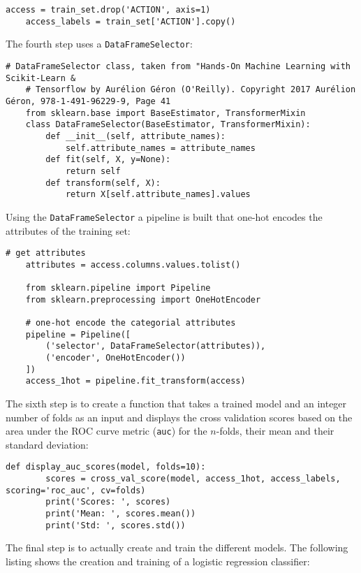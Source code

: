 \documentclass[11pt]{article}
\begin{document}
\begin{lstlisting}[frame=single]
    access = train_set.drop('ACTION', axis=1)
    access_labels = train_set['ACTION'].copy()
\end{lstlisting}
\noindent
The fourth step uses a {\tt DataFrameSelector}:

\begin{lstlisting}[frame=single]
    # DataFrameSelector class, taken from "Hands-On Machine Learning with Scikit-Learn & 
    # Tensorflow by Aurélion Géron (O'Reilly). Copyright 2017 Aurélion Géron, 978-1-491-96229-9, Page 41
    from sklearn.base import BaseEstimator, TransformerMixin
    class DataFrameSelector(BaseEstimator, TransformerMixin):
        def __init__(self, attribute_names):
            self.attribute_names = attribute_names
        def fit(self, X, y=None):
            return self
        def transform(self, X):
            return X[self.attribute_names].values
\end{lstlisting}
\noindent
Using the {\tt DataFrameSelector} a pipeline is built that one-hot encodes the attributes of the 
training set:

\begin{lstlisting}[frame=single]
    # get attributes
    attributes = access.columns.values.tolist()

    from sklearn.pipeline import Pipeline
    from sklearn.preprocessing import OneHotEncoder

    # one-hot encode the categorial attributes
    pipeline = Pipeline([
        ('selector', DataFrameSelector(attributes)),
        ('encoder', OneHotEncoder())
    ])
    access_1hot = pipeline.fit_transform(access)
\end{lstlisting}
\noindent
The sixth step is to create a function that takes a trained model and an integer
number of folds as an input and displays the cross validation scores based
on the area under the ROC curve metric ({\tt auc}) for the $n$-folds,
their mean and their standard deviation:

\begin{lstlisting}[frame=single]
    def display_auc_scores(model, folds=10):
        scores = cross_val_score(model, access_1hot, access_labels, scoring='roc_auc', cv=folds)
        print('Scores: ', scores)
        print('Mean: ', scores.mean())
        print('Std: ', scores.std())
\end{lstlisting}
\noindent
The final step is to actually create and train the different models. 
The following listing shows the creation and training 
of a logistic regression classifier:
\end{document}
